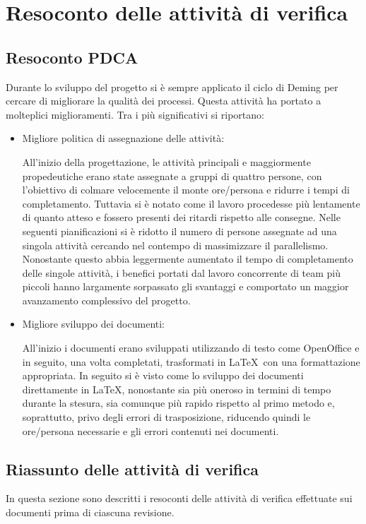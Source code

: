 \newpage

\section{Resoconto delle attività di verifica}

\subsection{Resoconto PDCA}

Durante lo sviluppo del progetto si è sempre applicato il ciclo di Deming per cercare di migliorare la qualità dei processi. Questa attività ha portato a molteplici miglioramenti.
Tra i più significativi si riportano:
\begin{itemize}


\item Migliore politica di assegnazione delle attività:

All'inizio della progettazione, le attività principali e maggiormente propedeutiche erano state assegnate a gruppi di quattro persone, con l'obiettivo di colmare velocemente il monte ore/persona e ridurre i tempi di completamento. Tuttavia si è notato come il lavoro procedesse più lentamente di quanto atteso e fossero presenti dei ritardi rispetto alle consegne. Nelle seguenti pianificazioni si è ridotto il numero di persone assegnate ad una singola attività cercando nel contempo di massimizzare il parallelismo. Nonostante questo abbia leggermente aumentato il tempo di completamento delle singole attività, i benefici portati dal lavoro concorrente di team più piccoli hanno largamente sorpassato gli svantaggi e comportato un maggior avanzamento complessivo del progetto.

\item Migliore sviluppo dei documenti:

All'inizio i documenti erano sviluppati utilizzando  di testo come OpenOffice e in seguito, una volta completati, trasformati in \LaTeX\ con una formattazione appropriata.
In seguito si è visto come lo sviluppo dei documenti direttamente in \LaTeX, nonostante sia più oneroso in termini di tempo durante la stesura, sia comunque più rapido rispetto al primo metodo e, soprattutto, privo degli errori di trasposizione, riducendo quindi le ore/persona necessarie e gli errori contenuti nei documenti.

\end{itemize}


\subsection{Riassunto delle attività di verifica}
In questa sezione sono descritti i resoconti delle attività di verifica effettuate sui documenti prima di ciascuna revisione.

